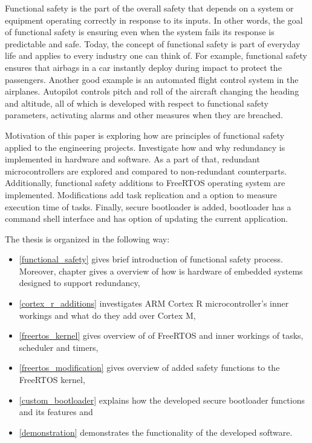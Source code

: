 Functional safety is the part of the overall safety that depends on a system or equipment operating correctly in response to its inputs.\cite{func_safety_brief} In other words, the goal of functional safety is ensuring even when the system fails its response is predictable and safe. Today, the concept of functional safety is part of everyday life and applies to every industry one can think of. For example, functional safety ensures that airbags in a car instantly deploy during impact to protect the passengers. Another good example is an automated flight control system in the airplanes. Autopilot controls pitch and roll of the aircraft changing the heading and altitude, all of which is developed with respect to functional safety parameters, activating alarms and other measures when they are breached.\cite{func_safety_brief}

Motivation of this paper is exploring how are principles of functional safety applied to the engineering projects. Investigate how and why redundancy is implemented in hardware and software. As a part of that, redundant microcontrollers are explored and compared to non-redundant counterparts. Additionally, functional safety additions to FreeRTOS operating system are implemented. Modifications add task replication and a option to measure execution time of tasks. Finally, secure bootloader is added, bootloader has a command shell interface and has option of updating the current application.

The thesis is organized in the following way:

\begin{itemize}

    \item \autoref{functional_safety} gives brief introduction of functional safety process. Moreover, chapter gives a overview of how is hardware of embedded systems designed to support redundancy,
    \item \autoref{cortex_r_additions} investigates ARM Cortex R microcontroller's inner workings and what do they add over Cortex M,
    \item \autoref{freertos_kernel} gives overview of of FreeRTOS and inner workings of tasks, scheduler and timers,
    \item \autoref{freertos_modification} gives overview of added safety functions to the FreeRTOS kernel,
    \item \autoref{custom_bootloader} explains how the developed secure bootloader functions and its features and
    \item \autoref{demonstration} demonstrates the functionality of the developed software.
    
\end{itemize}
   